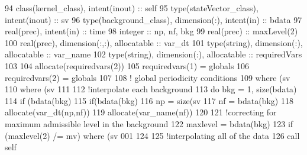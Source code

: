 \begin{DoxyCode}
94     \textcolor{keywordtype}{class}(kernel\_class), \textcolor{keywordtype}{intent(inout)} :: self
95     \textcolor{keywordtype}{type}(stateVector\_class), \textcolor{keywordtype}{intent(inout)} :: sv
96     \textcolor{keywordtype}{type}(background\_class), \textcolor{keywordtype}{dimension(:)}, \textcolor{keywordtype}{intent(in)} :: bdata
97     \textcolor{keywordtype}{real(prec)}, \textcolor{keywordtype}{intent(in)} :: time
98     \textcolor{keywordtype}{integer} :: np, nf, bkg
99     \textcolor{keywordtype}{real(prec)} :: maxLevel(2)
100     \textcolor{keywordtype}{real(prec)}, \textcolor{keywordtype}{dimension(:,:)}, \textcolor{keywordtype}{allocatable} :: var\_dt
101     \textcolor{keywordtype}{type}(string), \textcolor{keywordtype}{dimension(:)}, \textcolor{keywordtype}{allocatable} :: var\_name
102     \textcolor{keywordtype}{type}(string), \textcolor{keywordtype}{dimension(:)}, \textcolor{keywordtype}{allocatable} :: requiredVars
103 
104     \textcolor{keyword}{allocate}(requiredvars(2))
105     requiredvars(1) = globals%
106     requiredvars(2) = globals%
107         
108     \textcolor{comment}{! global periodicity conditions}
109     \textcolor{keywordflow}{where} (sv%
110     \textcolor{keywordflow}{where} (sv%
111 
112     \textcolor{comment}{!interpolate each background}
113     \textcolor{keywordflow}{do} bkg = 1, \textcolor{keyword}{size}(bdata)
114         \textcolor{keywordflow}{if} (bdata(bkg)%
115             \textcolor{keywordflow}{if}(bdata(bkg)%
116                 np = \textcolor{keyword}{size}(sv%
117                 nf = bdata(bkg)%
118                 \textcolor{keyword}{allocate}(var\_dt(np,nf))
119                 \textcolor{keyword}{allocate}(var\_name(nf))
120 
121                 \textcolor{comment}{!correcting for maximum admissible level in the background}
122                 maxlevel = bdata(bkg)%
123                 \textcolor{keywordflow}{if} (maxlevel(2) /= mv) \textcolor{keywordflow}{where} (sv%
      001
124 
125                 \textcolor{comment}{!interpolating all of the data}
126                 \textcolor{keyword}{call }self%

\end{DoxyCode}
